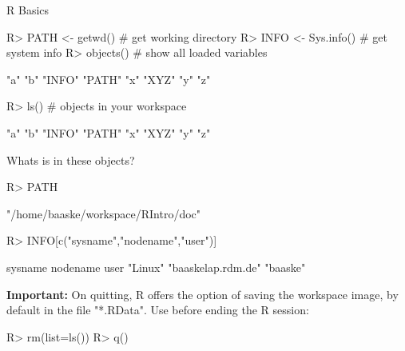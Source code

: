 \documentclass[10pt]{beamer}
\let\proglang=\textsf
\begin{document}
\begin{frame}[fragile]{\proglang{R} Basics}
\begin{Schunk}
\begin{Sinput}
R> PATH <- getwd()        # get working directory
R> INFO <- Sys.info()     # get system info  
R> objects()              # show all loaded variables
\end{Sinput}
\begin{Soutput}
[1] "a"    "b"    "INFO" "PATH" "x"    "XYZ"  "y"    "z"   
\end{Soutput}
\begin{Sinput}
R> ls()                   # objects in your workspace
\end{Sinput}
\begin{Soutput}
[1] "a"    "b"    "INFO" "PATH" "x"    "XYZ"  "y"    "z"   
\end{Soutput}
\end{Schunk}
Whats is in these objects?
\begin{Schunk}
\begin{Sinput}
R> PATH
\end{Sinput}
\begin{Soutput}
[1] "/home/baaske/workspace/RIntro/doc"
\end{Soutput}
\begin{Sinput}
R> INFO[c("sysname","nodename","user")]
\end{Sinput}
\begin{Soutput}
           sysname           nodename               user 
           "Linux" "baaskelap.rdm.de"           "baaske" 
\end{Soutput}
\end{Schunk}
\textbf{Important:} On quitting, R offers the option of saving the workspace
image, by default in the file "*.RData". Use before ending the R session:
\begin{Schunk}
\begin{Sinput}
R> rm(list=ls())
R> q()
\end{Sinput}
\end{Schunk}
\end{frame}
%
\end{document}
